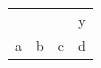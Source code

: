 \documentclass{article}
\begin{document}
\begin{NiceTabular}{cc|c!{\vrule}c}
 & & & y\\
a & b & c & d\\
\end{NiceTabular}
\end{document}
